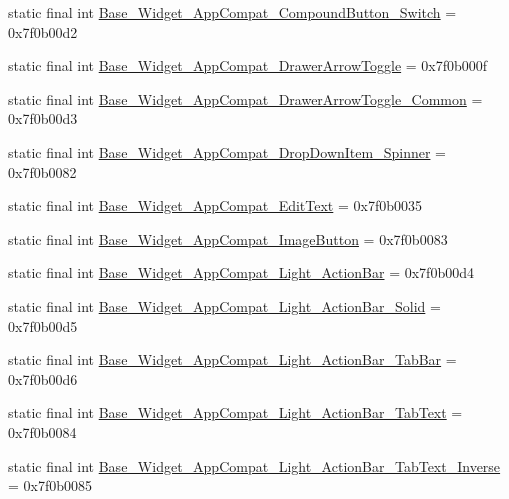 \begin{CompactItemize}
\item 
static final int \hyperlink{classandroid_1_1support_1_1v7_1_1recyclerview_1_1_r_1_1style_624f17fc47e30ee7a6e68975056e2d5b}{Base\_\-Widget\_\-AppCompat\_\-CompoundButton\_\-Switch} = 0x7f0b00d2
\item 
static final int \hyperlink{classandroid_1_1support_1_1v7_1_1recyclerview_1_1_r_1_1style_2cd4c7fa2f6694b20c786c9328ae776e}{Base\_\-Widget\_\-AppCompat\_\-DrawerArrowToggle} = 0x7f0b000f
\item 
static final int \hyperlink{classandroid_1_1support_1_1v7_1_1recyclerview_1_1_r_1_1style_315ceae69414ae8067a8f9ec44e3ebdf}{Base\_\-Widget\_\-AppCompat\_\-DrawerArrowToggle\_\-Common} = 0x7f0b00d3
\item 
static final int \hyperlink{classandroid_1_1support_1_1v7_1_1recyclerview_1_1_r_1_1style_1d5e028389ee9f0683db618012b6dc1e}{Base\_\-Widget\_\-AppCompat\_\-DropDownItem\_\-Spinner} = 0x7f0b0082
\item 
static final int \hyperlink{classandroid_1_1support_1_1v7_1_1recyclerview_1_1_r_1_1style_8ce5dee90bc6629efd0bfeeea43b0d3f}{Base\_\-Widget\_\-AppCompat\_\-EditText} = 0x7f0b0035
\item 
static final int \hyperlink{classandroid_1_1support_1_1v7_1_1recyclerview_1_1_r_1_1style_d69799e9f1c8ede38a4d2a12216d4331}{Base\_\-Widget\_\-AppCompat\_\-ImageButton} = 0x7f0b0083
\item 
static final int \hyperlink{classandroid_1_1support_1_1v7_1_1recyclerview_1_1_r_1_1style_3dd08227179e12bc414c667043f351b0}{Base\_\-Widget\_\-AppCompat\_\-Light\_\-ActionBar} = 0x7f0b00d4
\item 
static final int \hyperlink{classandroid_1_1support_1_1v7_1_1recyclerview_1_1_r_1_1style_3fc852240b997ec891e09f0a71322f10}{Base\_\-Widget\_\-AppCompat\_\-Light\_\-ActionBar\_\-Solid} = 0x7f0b00d5
\item 
static final int \hyperlink{classandroid_1_1support_1_1v7_1_1recyclerview_1_1_r_1_1style_a6a6c644c2a2cf252e1a9187ac9c72a2}{Base\_\-Widget\_\-AppCompat\_\-Light\_\-ActionBar\_\-TabBar} = 0x7f0b00d6
\item 
static final int \hyperlink{classandroid_1_1support_1_1v7_1_1recyclerview_1_1_r_1_1style_9a9a7a3f61066ae2a9b6815a963eca4f}{Base\_\-Widget\_\-AppCompat\_\-Light\_\-ActionBar\_\-TabText} = 0x7f0b0084
\item 
static final int \hyperlink{classandroid_1_1support_1_1v7_1_1recyclerview_1_1_r_1_1style_4f48ecd7cbd3fb86dfc7355df73f8680}{Base\_\-Widget\_\-AppCompat\_\-Light\_\-ActionBar\_\-TabText\_\-Inverse} = 0x7f0b0085

\end{CompactItemize}
